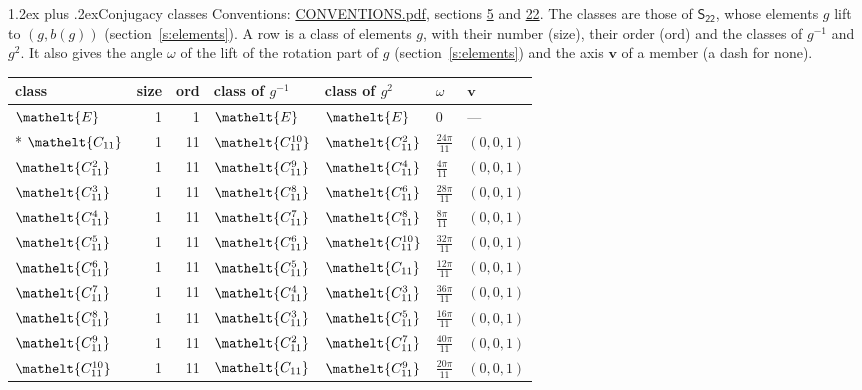 \documentclass[10pt,a4paper]{article}
\makeatletter
\renewcommand\section{\@startsection{section}{1}{\z@}{-3ex plus -1ex minus -.2ex}%
  {1.2ex plus .2ex}{\normalfont\large\sffamily\bfseries\color{parttitle}}}
\numberwithin{equation}{section}
\newcommand{\eltfont}[1]{{\let\sigma\eltsigma\mathelt{#1}}}
\newcommand{\grp}[1]{\mathsf{#1}}
\newcommand{\cls}[1]{\eltfont{#1}}
\newcommand{\dirvec}[3]{(#1, #2, #3)}
\newcommand{\vv}{\mathbf{v}}
\makeatother
\begin{document}
\section{Conjugacy classes}\label{s:classes}
Conventions: \href{../../CONVENTIONS.pdf}{CONVENTIONS.pdf}, sections \href{../../../rotation/CONVENTIONS.pdf\#conv.5}{5} and \href{../../CONVENTIONS.pdf\#conv.22}{22}.
The classes are those of $\grp{S_{22}}$, whose elements $g$ lift to $(g, b(g))$ (section~\ref{s:elements}).
\leavevmode\label{n:head.size}\label{n:head.classof}A row is a class of elements $g$, with their number (size), their order (ord) and the classes of $g^{-1}$ and $g^{2}$. It also gives the angle $\omega$ of the lift of the rotation part of $g$ (section~\ref{s:elements}) and the axis $\vv$ of a member (a dash for none).
{\renewcommand{\arraystretch}{1.3}\begin{longtable}{@{}lrrllll@{}}\toprule
class & size & ord & class of $g^{-1}$ & class of $g^{2}$ & $\omega$ & $\vv$\\\midrule\endhead
\bottomrule\endfoot\endlastfoot
$\cls{E}$ & 1 & 1 & $\cls{E}$ & $\cls{E}$ & $0$ & ---\\*
$\cls{C_{11}}$ & 1 & 11 & $\cls{C_{11}^{10}}$ & $\cls{C_{11}^{2}}$ & $\tfrac{24\pi}{11}$ & $\dirvec{0}{0}{1}$\\
$\cls{C_{11}^{2}}$ & 1 & 11 & $\cls{C_{11}^{9}}$ & $\cls{C_{11}^{4}}$ & $\tfrac{4\pi}{11}$ & $\dirvec{0}{0}{1}$\\
$\cls{C_{11}^{3}}$ & 1 & 11 & $\cls{C_{11}^{8}}$ & $\cls{C_{11}^{6}}$ & $\tfrac{28\pi}{11}$ & $\dirvec{0}{0}{1}$\\
$\cls{C_{11}^{4}}$ & 1 & 11 & $\cls{C_{11}^{7}}$ & $\cls{C_{11}^{8}}$ & $\tfrac{8\pi}{11}$ & $\dirvec{0}{0}{1}$\\
$\cls{C_{11}^{5}}$ & 1 & 11 & $\cls{C_{11}^{6}}$ & $\cls{C_{11}^{10}}$ & $\tfrac{32\pi}{11}$ & $\dirvec{0}{0}{1}$\\
$\cls{C_{11}^{6}}$ & 1 & 11 & $\cls{C_{11}^{5}}$ & $\cls{C_{11}}$ & $\tfrac{12\pi}{11}$ & $\dirvec{0}{0}{1}$\\
$\cls{C_{11}^{7}}$ & 1 & 11 & $\cls{C_{11}^{4}}$ & $\cls{C_{11}^{3}}$ & $\tfrac{36\pi}{11}$ & $\dirvec{0}{0}{1}$\\
$\cls{C_{11}^{8}}$ & 1 & 11 & $\cls{C_{11}^{3}}$ & $\cls{C_{11}^{5}}$ & $\tfrac{16\pi}{11}$ & $\dirvec{0}{0}{1}$\\
$\cls{C_{11}^{9}}$ & 1 & 11 & $\cls{C_{11}^{2}}$ & $\cls{C_{11}^{7}}$ & $\tfrac{40\pi}{11}$ & $\dirvec{0}{0}{1}$\\
$\cls{C_{11}^{10}}$ & 1 & 11 & $\cls{C_{11}}$ & $\cls{C_{11}^{9}}$ & $\tfrac{20\pi}{11}$ & $\dirvec{0}{0}{1}$\\

\end{longtable}}
\end{document}
